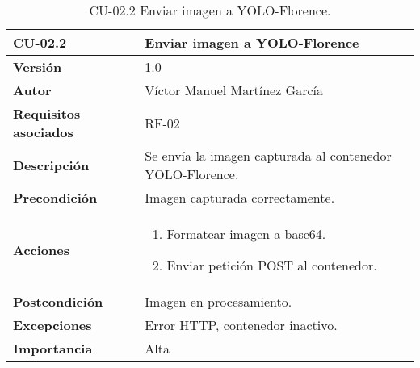\begin{table}[p]
    \centering
    \begin{tabularx}{\linewidth}{ p{} p{} }
        \toprule
        \textbf{CU-02.2}    & \textbf{Enviar imagen a YOLO-Florence}\\
        \toprule
        \textbf{Versión}              & 1.0 \\
        \textbf{Autor}                & Víctor Manuel Martínez García \\
        \textbf{Requisitos asociados} & RF-02 \\
        \textbf{Descripción}          & Se envía la imagen capturada al contenedor YOLO-Florence.\\
        \textbf{Precondición}         & Imagen capturada correctamente.\\
        \textbf{Acciones}             &
        \begin{enumerate}
          \item Formatear imagen a base64.
          \item Enviar petición POST al contenedor.
        \end{enumerate}\\
        \textbf{Postcondición}        & Imagen en procesamiento.\\
        \textbf{Excepciones}          & Error HTTP, contenedor inactivo.\\
        \textbf{Importancia}          & Alta \\
        \bottomrule
        \end{tabularx}
    \caption{CU-02.2 Enviar imagen a YOLO-Florence.}
    \label{CU-02.2 Enviar Imagen a YOLO-Florence}
\end{table}


